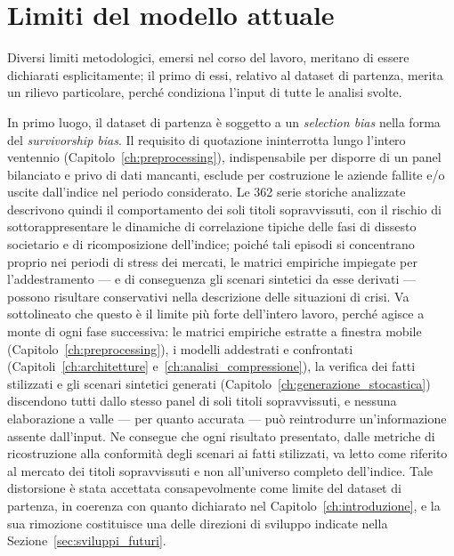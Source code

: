 \section{Limiti del modello attuale}
\label{sec:limiti_modello}

Diversi limiti metodologici, emersi nel corso del lavoro, meritano di essere dichiarati esplicitamente; il primo di essi, relativo al dataset di partenza, merita un rilievo particolare, perché condiziona l'input di tutte le analisi svolte.

In primo luogo, il dataset di partenza è soggetto a un \emph{selection bias} nella forma del \emph{survivorship bias}. Il requisito di quotazione ininterrotta lungo l'intero ventennio (Capitolo~\ref{ch:preprocessing}), indispensabile per disporre di un panel bilanciato e privo di dati mancanti, esclude per costruzione le aziende fallite e/o uscite dall'indice nel periodo considerato. Le 362 serie storiche analizzate descrivono quindi il comportamento dei soli titoli sopravvissuti, con il rischio di sottorappresentare le dinamiche di correlazione tipiche delle fasi di dissesto societario e di ricomposizione dell'indice; poiché tali episodi si concentrano proprio nei periodi di stress dei mercati, le matrici empiriche impiegate per l'addestramento --- e di conseguenza gli scenari sintetici da esse derivati --- possono risultare conservativi nella descrizione delle situazioni di crisi. Va sottolineato che questo è il limite più forte dell'intero lavoro, perché agisce a monte di ogni fase successiva: le matrici empiriche estratte a finestra mobile (Capitolo~\ref{ch:preprocessing}), i modelli addestrati e confrontati (Capitoli~\ref{ch:architetture} e~\ref{ch:analisi_compressione}), la verifica dei fatti stilizzati e gli scenari sintetici generati (Capitolo~\ref{ch:generazione_stocastica}) discendono tutti dallo stesso panel di soli titoli sopravvissuti, e nessuna elaborazione a valle --- per quanto accurata --- può reintrodurre un'informazione assente dall'input. Ne consegue che ogni risultato presentato, dalle metriche di ricostruzione alla conformità degli scenari ai fatti stilizzati, va letto come riferito al mercato dei titoli sopravvissuti e non all'universo completo dell'indice. Tale distorsione è stata accettata consapevolmente come limite del dataset di partenza, in coerenza con quanto dichiarato nel Capitolo~\ref{ch:introduzione}, e la sua rimozione costituisce una delle direzioni di sviluppo indicate nella Sezione~\ref{sec:sviluppi_futuri}.

